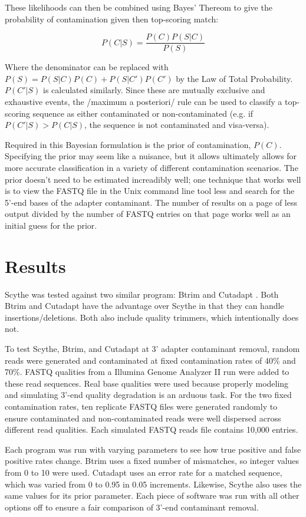 \documentclass{bioinfo}
\begin{document}
\begin{methods}
These likelihoods can then be combined using Bayes' Thereom to give
the probability of contamination given then top-scoring match:

$$ P(C|S) = \frac{P(C) P(S|C)}{P(S)} $$

Where the denominator can be replaced with $P(S) = P(S | C)P(C) +
P(S | C') P(C')$ by the Law of Total Probability. $P(C'|S)$ is
calculated similarly. Since these are mutually exclusive and
exhaustive events, the /maximum a posteriori/ rule can be used to
classify a top-scoring sequence as either contaminated or
non-contaminated (e.g. if $P(C'|S) > P(C|S)$, the sequence is not
contaminated and visa-versa).

Required in this Bayesian formulation is the prior of contamination,
$P(C)$. Specifying the prior may seem like a nuisance, but it allows
ultimately allows for more accurate classification in a variety of
different contamination scenarios. The prior doesn't need to be
estimated increadibly well; one technique that works well is to view
the FASTQ file in the Unix command line tool less and search for the
5'-end bases of the adapter contaminant. The number of results on a
page of less output divided by the number of FASTQ entries on that
page works well as an initial guess for the prior.


\section{Results}
Scythe was tested against two similar program: Btrim
\cite{pmid21651976} and Cutadapt \cite{pmid19737799}. Both Btrim and
Cutadapt have the advantage over Scythe in that they can handle
insertions/deletions. Both also include quality trimmers, which
intentionally does not. 

To test Scythe, Btrim, and Cutadapt at 3' adapter contaminant removal,
random reads were generated and contaminated at fixed contamination
rates of 40\% and 70\%. FASTQ qualities from a Illumina Genome
Analyzer II run were added to these read sequences. Real base
qualities were used because properly modeling and simulating 3'-end
quality degradation is an arduous task. For the two fixed
contamination rates, ten replicate FASTQ files were generated randomly
to ensure contaminated and non-contaminated reads were well dispersed
across different read qualities. Each simulated FASTQ reads file
contains 10,000 entries.

Each program was run with varying parameters to see how true positive
and false positive rates change. Btrim uses a fixed number of
mismatches, so integer values from 0 to 10 were used. Cutadapt uses an
error rate for a matched sequence, which was varied from 0 to 0.95 in
0.05 increments. Likewise, Scythe also uses the same values for its
prior parameter. Each piece of software was run with all other options
off to ensure a fair comparison of 3'-end contaminant removal.


\end{methods}
\end{document}
